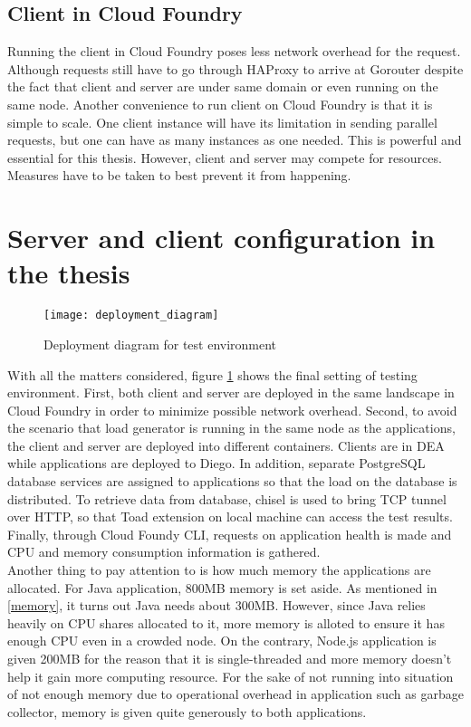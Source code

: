 \subsection{Client in Cloud Foundry}
Running the client in Cloud Foundry poses less network overhead for the request. Although requests still have to go through HAProxy to arrive at Gorouter despite the fact that client and server are under same domain or even running on the same node. Another convenience to run client on Cloud Foundry is that it is simple to scale. One client instance will have its limitation in sending parallel requests, but one can have as many instances as one needed. This is powerful and essential for this thesis. However, client and server may compete for resources. Measures have to be taken to best prevent it from happening. 

\section{Server and client configuration in the thesis}
\begin{figure}[h]
	\centering
	\texttt{[image: deployment\_diagram]}
	\caption{Deployment diagram for test environment}
	\label{deployment-diagram}
\end{figure}
With all the matters considered, figure \ref{deployment-diagram} shows the final setting of testing environment. First, both client and server are deployed in the same landscape in Cloud Foundry in order to minimize possible network overhead. Second, to avoid the scenario that load generator is running in the same node as the applications, the client and server are deployed into different containers. Clients are in DEA while applications are deployed to Diego. In addition, separate PostgreSQL database services are assigned to applications so that the load on the database is distributed. To retrieve data from database, chisel is used to bring TCP tunnel over HTTP, so that Toad extension on local machine can access the test results. Finally, through Cloud Foundy CLI, requests on application health is made and CPU and memory consumption information is gathered. \\
Another thing to pay attention to is how much memory the applications are allocated. For Java application, 800MB memory is set aside. As mentioned in \ref{memory}, it turns out Java needs about 300MB. However, since Java relies heavily on CPU shares allocated to it, more memory is alloted to ensure it has enough CPU even in a crowded node. On the contrary, Node.js application is given 200MB for the reason that it is single-threaded and more memory doesn't help it gain more computing resource. For the sake of not running into situation of not enough memory due to operational overhead in application such as garbage collector, memory is given quite generously to both applications.  



